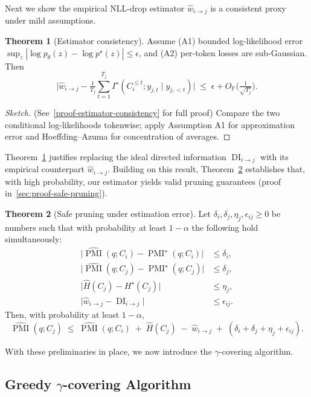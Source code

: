 \documentclass{article} %
\theoremstyle{definition}
\newtheorem{theorem}{Theorem}[section]
\newcommand{\PP}{\mathbb{P}}
\DeclareMathOperator{\DI}{DI}
\DeclareMathOperator{\PMI}{PMI}
\begin{document}
Next we show the empirical NLL-drop estimator $\hat{w}_{i\to j}$ is a consistent proxy under mild assumptions.

\begin{theorem}[Estimator consistency]
\label{thm:consistency}
Assume (A1) bounded log-likelihood error $\sup_z|\log p_\theta(z)-\log p^\star(z)|\le\epsilon$, and 
(A2) per-token losses are sub-Gaussian.  
Then
\[
\big|\hat{w}_{i\to j} - \tfrac{1}{T_j}\sum_{t=1}^{T_j} I^\star(C_i^{\le t}; y_{j,t}\mid y_{j,<t})\big|
\;\le\;\epsilon + O_{\PP}\Big(\tfrac{1}{\sqrt{T_j}}\Big).
\]
\end{theorem}

\begin{proof}[Sketch] (See~\ref{proof-estimator-consistency} for full proof)
Compare the two conditional log-likelihoods tokenwise; apply Assumption A1 for approximation error and Hoeffding--Azuma for concentration of averages.
\end{proof}

Theorem~\ref{thm:consistency} justifies replacing the ideal directed information $\DI_{i\to j}$ with its empirical counterpart $\hat{w}_{i\to j}$. Building on this result, Theorem~\ref{thm:safe-pruning} establishes that, with high probability, our estimator yields valid pruning guarantees (proof in~\ref{sec:proof-safe-pruning}).

\begin{theorem}[Safe pruning under estimation error]
\label{thm:safe-pruning}
Let $\delta_i,\delta_j,\eta_j,\epsilon_{ij}\ge0$ be numbers such that with probability at least $1-\alpha$ the following hold simultaneously:
\begin{align*}
\big|\widehat{\PMI}(q;C_i)-\PMI^\star(q;C_i)\big| &\le \delta_i,\\
\big|\widehat{\PMI}(q;C_j)-\PMI^\star(q;C_j)\big| &\le \delta_j,\\
\big|\hat{H}(C_j)-H^\star(C_j)\big| &\le \eta_j,\\
\big|\hat{w}_{i\to j}-\DI_{i\to j}\big| &\le \epsilon_{ij}.
\end{align*}
Then, with probability at least $1-\alpha$,
\[
\widehat{\PMI}(q;C_j)
\;\le\;
\widehat{\PMI}(q;C_i) \;+\; \hat{H}(C_j) \;-\; \hat{w}_{i\to j}
\;+\; (\delta_i+\delta_j+\eta_j+\epsilon_{ij}).
\]
\end{theorem}

With these preliminaries in place, we now introduce the $\gamma$-covering algorithm.

\subsection{Greedy $\gamma$-covering Algorithm}
\end{document}
